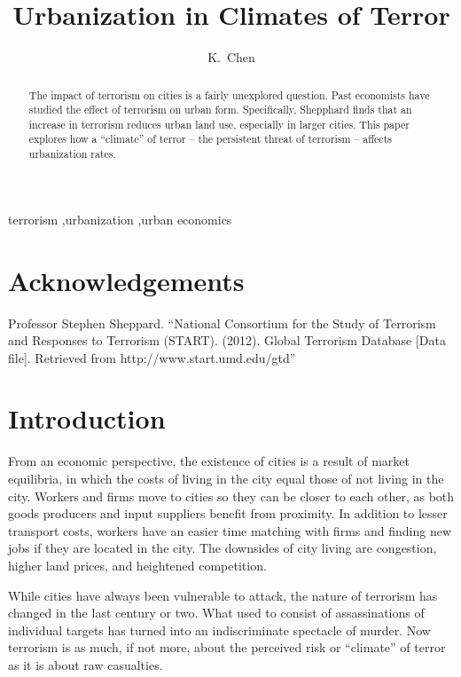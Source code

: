 \documentclass[preprint,2p,12pt]{elsarticle}
\begin{document}
\begin{frontmatter}
\title{Urbanization in Climates of Terror}
\author[kevin]{K.~Chen}
\address[kevin]{Williams College}

\begin{abstract}
The impact of terrorism on cities is a fairly unexplored question. Past economists have studied the effect of terrorism on urban form. Specifically, Shepphard finds that an increase in terrorism reduces urban land use, especially in larger cities. This paper explores how a ``climate'' of terror -- the  persistent threat of terrorism -- affects urbanization rates.
\end{abstract}

\begin{keyword}
terrorism \sep urbanization \sep urban economics
\end{keyword}

\end{frontmatter}

\doublespacing

\section*{\sc Acknowledgements}
Professor Stephen Sheppard. ``National Consortium for the Study of Terrorism and Responses to Terrorism (START). (2012). Global Terrorism Database [Data file]. Retrieved from http://www.start.umd.edu/gtd''

\section{\sc Introduction}
From an economic perspective, the existence of cities is a result of market equilibria, in which the costs of living in the city equal those of not living in the city. Workers and firms move to cities so they can be closer to each other, as both goods producers and input suppliers benefit from proximity. In addition to lesser transport costs, workers have an easier time matching with firms and finding new jobs if they are located in the city. The downsides of city living are congestion, higher land prices, and heightened competition.

While cities have always been vulnerable to attack, the nature of terrorism has changed in the last century or two. What used to consist of assassinations of individual targets has turned into an indiscriminate spectacle of murder. Now terrorism is as much, if not more, about the perceived risk or ``climate'' of terror as it is about raw casualties.
\end{document}
